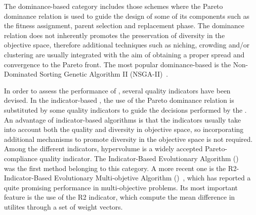 The dominance-based category includes those schemes where the Pareto dominance relation is used to guide the 
design of some of its components such as the fitness assignment, parent selection and replacement phase.
%
The dominance relation does not inherently promotes the preservation of diversity in the objective space, 
therefore additional techniques such as niching, crowding and/or clustering are usually integrated with the aim of 
obtaining a proper spread and convergence to the Pareto front.
%
The most popular dominance-based \MOEA{} is the Non-Dominated Sorting Genetic Algorithm II (NSGA-II)~\cite{Joel:NSGAII}. 
%

In order to assess the performance of \MOEAS{}, several quality indicators have been devised.
%
In the indicator-based \MOEAS{}, the use of the Pareto dominance relation is substituted by some quality indicators 
to guide the decisions performed by the \MOEA{}.
%
An advantage of indicator-based algorithms is that the indicators usually take into account both the quality and 
diversity in objective space, so incorporating additional mechanisms to promote diversity in the objective 
space is not required.
%
Among the different indicators, hypervolume is a widely accepted Pareto-compliance quality indicator.
%
The Indicator-Based Evolutionary Algorithm (\IBEA{})~\cite{Joel:IBEA} was the first method belonging to this category.
%
A more recent one is the R2-Indicator-Based Evolutionary Multi-objetive Algorithm (\RMOEA{})~\cite{trautmann2013r2}, 
%
%
which has reported a quite promising performance in multi-objective problems.
%
%
%
Its most important feature is the use of the R2 indicator, which compute the mean difference in utilites through a set of weight vectors.
%

